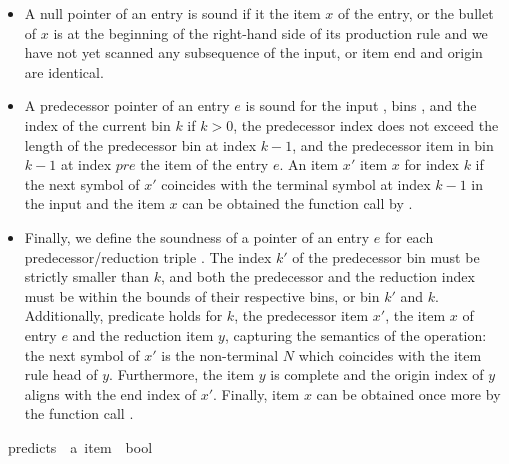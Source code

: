 \begin{isabellebody}
\begin{isamarkuptext}
\begin{itemize}
  \item A null pointer  of an entry is sound if it  the item $x$ of
    the entry, or the bullet of $x$ is at the beginning of the right-hand side of its production rule
    and we have not yet scanned any subsequence of the input, or item end and origin are identical.
  \item A predecessor pointer  of an entry $e$ is sound for the input \isa{{\isasymomega}}, bins ,
    and the index of the current bin $k$ if $k > 0$, the predecessor index does not exceed the length
    of the predecessor bin at index $k-1$, and the predecessor item in bin $k-1$ at index $pre$ 
    the item of the entry $e$. An item $x'$  item $x$ for index $k$ if the next symbol of
    $x'$ coincides with the terminal symbol at index $k-1$ in the input \isa{{\isasymomega}} and the item $x$ can be obtained the function call
    by . 
  \item Finally, we define the soundness of a pointer  of an entry $e$ for each predecessor/reduction
    triple . The index $k'$ of the predecessor bin must be strictly
    smaller than $k$, and both the predecessor and the reduction index must be within the bounds of their
    respective bins, or bin $k'$ and $k$. Additionally, predicate  holds for $k$,
    the predecessor item $x'$, the item $x$ of entry $e$ and the reduction item $y$, capturing the semantics of
    the  operation: the next symbol of $x'$ is the non-terminal $N$ which coincides
    with the item rule head of $y$. Furthermore, the item $y$ is complete and the origin index of $y$
    aligns with the end index of $x'$. Finally, item $x$ can be obtained once more by the function call .
\end{itemize}%
\end{isamarkuptext}\isamarkuptrue%
\isamarkupfalse%
\ predicts\ {\isacharcolon}{\kern0pt}{\isacharcolon}{\kern0pt}\ {\isachardoublequoteopen}{\isacharprime}{\kern0pt}a\ item\ {\isasymRightarrow}\ bool{\isachardoublequoteclose}\ \isanewline

\end{isabellebody}
